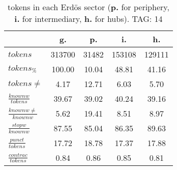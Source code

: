 \begin{table}[h!]
\begin{center}
\begin{tabular}{| l | c | c | c | c |}\hline
 & g. & p. & i. & h. \\\hline
$tokens$ & 313700  & 31482  & 153108  & 129111 \\\hline
$tokens_{\%}$ & 100.00  & 10.04  & 48.81  & 41.16 \\\hline
$tokens \neq$ & 4.17  & 12.71  & 6.03  & 5.70 \\\hline
$\frac{knownw}{tokens}$ & 39.67  & 39.02  & 40.24  & 39.16 \\\hline
$\frac{knownw \neq}{knownw}$ & 5.62  & 19.41  & 8.51  & 8.97 \\\hline
$\frac{stopw}{knownw}$ & 87.55  & 85.04  & 86.35  & 89.63 \\\hline
$\frac{punct}{tokens}$ & 17.72  & 18.78  & 17.37  & 17.88 \\\hline
$\frac{contrac}{tokens}$ & 0.84  & 0.86  & 0.85  & 0.81 \\\hline
\end{tabular}
\caption{tokens in each Erd\"os sector ({{\bf p.}} for periphery, {{\bf i.}} for intermediary, 
    {{\bf h.}} for hubs). TAG: 14}
\end{center}
\end{table}
